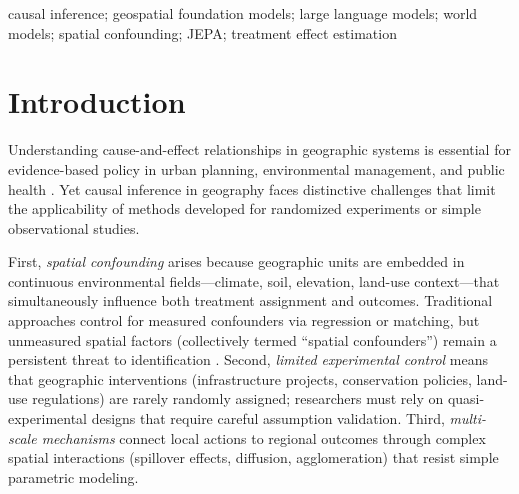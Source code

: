 \documentclass{article}
\begin{document}
\begin{abstract}
The three angles are interconnected through explicit cross-angle bridges: Angle~B interprets Angle~A statistical results via LLM mechanism explanation and generates scenarios consumable by Angle~C; Angle~A's ATT estimates calibrate Angle~C's world model predictions via a scaling factor on the scenario encoding magnitude. We validate the framework on six synthetic datasets with known ground-truth causal effects (true ATE ranging from $-8.0$ to $+15{,}000$) and demonstrate that all three angles produce consistent, complementary insights. The complete system comprises 3{,}245 lines of production code with 2{,}088 lines of tests (82 test functions), integrated into an operational GIS agent platform.
\end{abstract}

\begin{keywords}
causal inference; geospatial foundation models; large language models; world models; spatial confounding; JEPA; treatment effect estimation
\end{keywords}


\section{Introduction}
\label{sec:intro}

Understanding cause-and-effect relationships in geographic systems is essential for evidence-based policy in urban planning, environmental management, and public health \citep{verburg2004lulc}. Yet causal inference in geography faces distinctive challenges that limit the applicability of methods developed for randomized experiments or simple observational studies.

First, \textit{spatial confounding} arises because geographic units are embedded in continuous environmental fields---climate, soil, elevation, land-use context---that simultaneously influence both treatment assignment and outcomes. Traditional approaches control for measured confounders via regression or matching, but unmeasured spatial factors (collectively termed ``spatial confounders'') remain a persistent threat to identification \citep{pearl2009causality}. Second, \textit{limited experimental control} means that geographic interventions (infrastructure projects, conservation policies, land-use regulations) are rarely randomly assigned; researchers must rely on quasi-experimental designs that require careful assumption validation. Third, \textit{multi-scale mechanisms} connect local actions to regional outcomes through complex spatial interactions (spillover effects, diffusion, agglomeration) that resist simple parametric modeling.
\end{document}

